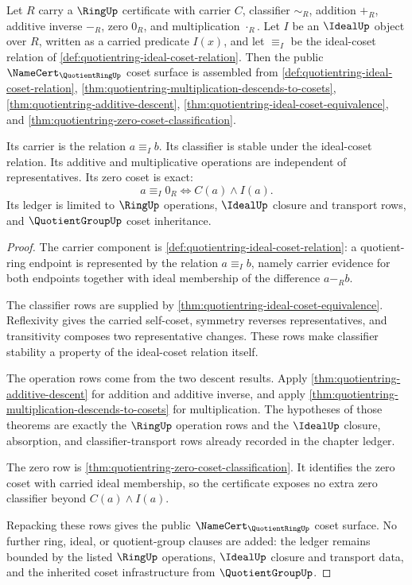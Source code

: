 \begin{theorem}
\label{thm:quotientring-public-coset-certificate}
Let $R$ carry a $\RingUp$ certificate with carrier $C$, classifier $\sim_R$, addition $+_R$, additive inverse $-_R$, zero $0_R$, and multiplication $\cdot_R$. Let $I$ be an $\IdealUp$ object over $R$, written as a carried predicate $I(x)$, and let $\equiv_I$ be the ideal-coset relation of \autoref{def:quotientring-ideal-coset-relation}. Then the public $\NameCert_{\QuotientRingUp}$ coset surface is assembled from \autoref{def:quotientring-ideal-coset-relation}, \autoref{thm:quotientring-multiplication-descends-to-cosets}, \autoref{thm:quotientring-additive-descent}, \autoref{thm:quotientring-ideal-coset-equivalence}, and \autoref{thm:quotientring-zero-coset-classification}.

Its carrier is the relation $a\equiv_I b$. Its classifier is stable under the ideal-coset relation. Its additive and multiplicative operations are independent of representatives. Its zero coset is exact:
$$
a\equiv_I 0_R\Longleftrightarrow C(a)\land I(a).
$$
Its ledger is limited to $\RingUp$ operations, $\IdealUp$ closure and transport rows, and $\QuotientGroupUp$ coset inheritance.
\end{theorem}
\begin{proof}
The carrier component is \autoref{def:quotientring-ideal-coset-relation}: a quotient-ring endpoint is represented by the relation $a\equiv_I b$, namely carrier evidence for both endpoints together with ideal membership of the difference $a-_R b$.

The classifier rows are supplied by \autoref{thm:quotientring-ideal-coset-equivalence}. Reflexivity gives the carried self-coset, symmetry reverses representatives, and transitivity composes two representative changes. These rows make classifier stability a property of the ideal-coset relation itself.

The operation rows come from the two descent results. Apply \autoref{thm:quotientring-additive-descent} for addition and additive inverse, and apply \autoref{thm:quotientring-multiplication-descends-to-cosets} for multiplication. The hypotheses of those theorems are exactly the $\RingUp$ operation rows and the $\IdealUp$ closure, absorption, and classifier-transport rows already recorded in the chapter ledger.

The zero row is \autoref{thm:quotientring-zero-coset-classification}. It identifies the zero coset with carried ideal membership, so the certificate exposes no extra zero classifier beyond $C(a)\land I(a)$.

Repacking these rows gives the public $\NameCert_{\QuotientRingUp}$ coset surface. No further ring, ideal, or quotient-group clauses are added: the ledger remains bounded by the listed $\RingUp$ operations, $\IdealUp$ closure and transport data, and the inherited coset infrastructure from $\QuotientGroupUp$.
\end{proof}

